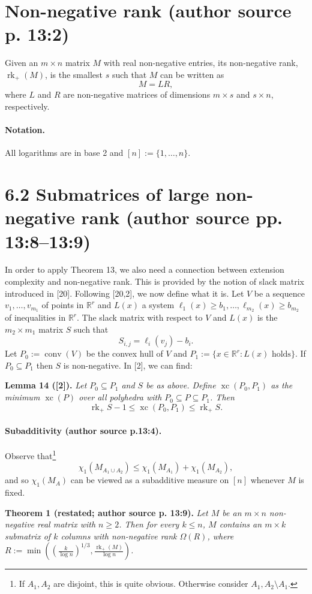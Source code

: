 \documentclass[10pt,a4paper]{article}
\newcommand{\rk}{\operatorname{rk}}
\newcommand{\xc}{\operatorname{xc}}
\newcommand{\conv}{\operatorname{conv}}
\newcommand{\RR}{\mathbb R}
\newenvironment{originalresult}[1]{\par\medskip\noindent\textbf{#1.}\itshape}{\par\medskip}
\begin{document}
\section*{Non-negative rank (author source p. 13:2)}
Given an $m\times n$ matrix $M$ with real non-negative entries, its non-negative rank, $\rk_+(M)$, is the smallest $s$ such that $M$ can be written as
\[M=LR,\]
where $L$ and $R$ are non-negative matrices of dimensions $m\times s$ and $s\times n$, respectively.
\paragraph{Notation.} All logarithms are in base 2 and $[n]:=\{1,\ldots,n\}$.
\section*{6.2 Submatrices of large non-negative rank (author source pp. 13:8--13:9)}
In order to apply Theorem 13, we also need a connection between extension complexity and non-negative rank. This is provided by the notion of slack matrix introduced in [20]. Following [20,2], we now define what it is. Let $V$ be a sequence $v_1,\ldots,v_{m_1}$ of points in $\RR^r$ and $L(x)$ a system $\ell_1(x)\ge b_1,\ldots,\ell_{m_2}(x)\ge b_{m_2}$ of inequalities in $\RR^r$. The slack matrix with respect to $V$ and $L(x)$ is the $m_2\times m_1$ matrix $S$ such that
\[S_{i,j}=\ell_i(v_j)-b_i.\]
Let $P_0:=\conv(V)$ be the convex hull of $V$ and $P_1:=\{x\in\RR^r:L(x)\text{ holds}\}$. If $P_0\subseteq P_1$ then $S$ is non-negative. In [2], we can find:
\begin{originalresult}{Lemma 14 ([2])}
Let $P_0\subseteq P_1$ and $S$ be as above. Define $\xc(P_0,P_1)$ as the minimum $\xc(P)$ over all polyhedra with $P_0\subseteq P\subseteq P_1$. Then
\[\rk_+S-1\le\xc(P_0,P_1)\le\rk_+S.\]
\end{originalresult}

\paragraph{Subadditivity (author source p.13:4).}
Observe that\footnote{If $A_1,A_2$ are disjoint, this is quite obvious. Otherwise consider $A_1,A_2\setminus A_1$.}
\[\chi_1(M_{A_1\cup A_2})\le\chi_1(M_{A_1})+\chi_1(M_{A_2}),\tag{1}\]
and so $\chi_1(M_A)$ can be viewed as a subadditive measure on $[n]$ whenever $M$ is fixed.

\begin{originalresult}{Theorem 1 (restated; author source p. 13:9)}
Let $M$ be an $m\times n$ non-negative real matrix with $n\ge2$. Then for every $k\le n$, $M$ contains an $m\times k$ submatrix of $k$ columns with non-negative rank $\Omega(R)$, where $R:=\min((\frac k{\log n})^{1/3},\frac{\rk_+(M)}{\log n})$.
\end{originalresult}
\end{document}
